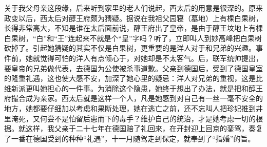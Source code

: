   关于我父母亲这段缘，后来听到家里的老人们说起，西太后的用意是很深的。原来政变以后，西太后对醇王府颇为猜疑。据说在我祖父园寝（墓地）上有棵白果树，长得非常高大，不知是谁在太后面前说，醇王府出了皇帝，是由于醇王坟地上有棵白果树，“白”和“王”连起来不就是个“皇”字吗？听了，立即叫人到妙高峰把白果树砍掉了。引起她猜疑的其实不仅是白果树，更重要的是洋人对于和兄弟的兴趣。事件前，她就觉得可怕的洋人有点倾心于，对她却是不太客气。后，联军统帅提出，要皇帝的兄弟做代表，去德国为公使被杀事道歉。父亲到德国后，受到了德国皇室的隆重礼遇，这也使大感不安，加深了她心里的疑忌：洋人对兄弟的重视，这是比维新派更叫她担心的一件事。为消除这个隐患，她终于想出了办法，就是把和醇王府撮合成为亲家。西太后就是这样一个人，凡是她感到对自己有一丝一毫不安全的地方，她都要仔细加以考虑和果断处理，她在逃亡之前，还不忘叫人把珍妃推到井里淹死，又何尝不是怕留后患而下的毒手？维护自己的统治，才是她考虑一切的根据。就这样，我父亲于二十七年在德国赔了礼回来，在开封迎上回京的銮驾，奏复了一番在德国受到的种种“礼遇”，十一月随驾走到保定，就奉到了“指婚”的旨。
